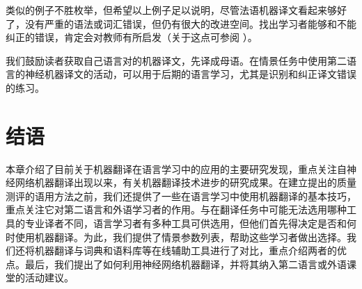\documentclass[output=paper,colorlinks,citecolor=brown]{langscibook}
\begin{document}
\begin{sloppypar}
类似的例子不胜枚举，但希望以上例子足以说明，尽管法语机器译文看起来够好了，没有严重的语法或词汇错误，但仍有很大的改进空间。找出学习者能够和不能纠正的错误，肯定会对教师有所启发（关于这点可参阅 \citet{LoockLéchauguette2021}）。
\end{sloppypar}

\newpage
我们鼓励读者获取自己语言对的机器译文，先译成母语。在情景任务中使用第二语言的神经机器译文的活动，可以用于后期的语言学习，尤其是识别和纠正译文错误的练习。

\section{结语}\label{sec:carre:7}
本章介绍了目前关于机器翻译在语言学习中的应用的主要研究发现，重点关注自神经网络机器翻译出现以来，有关机器翻译技术进步的研究成果。在建立提出的质量测评的语用方法之前，我们还提供了一些在语言学习中使用机器翻译的基本技巧，重点关注它对第二语言和外语学习者的作用。与在翻译任务中可能无法选用哪种工具的专业译者不同，语言学习者有多种工具可供选用，但他们首先得决定是否和何时使用机器翻译。为此，我们提供了情景参数列表，帮助这些学习者做出选择。我们还将机器翻译与词典和语料库等在线辅助工具进行了对比，重点介绍两者的优点。最后，我们提出了如何利用神经网络机器翻译，并将其纳入第二语言或外语课堂的活动建议。

\printbibliography[heading=subbibliography,notkeyword=this]
\end{document}

